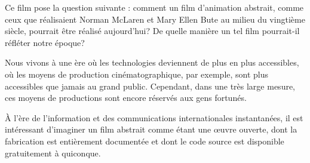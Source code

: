 


Ce film pose la question suivante : comment un film d'animation abstrait, comme ceux que réalisaient Norman McLaren et Mary Ellen Bute au milieu du vingtième siècle, pourrait être réalisé aujourd'hui? De quelle manière un tel film pourrait-il réfléter notre époque?

Nous vivons à une ère où les technologies deviennent de plus en plus accessibles, où les moyens de production cinématographique, par exemple, sont plus accessibles que jamais au grand public. Cependant, dans une très large mesure, ces moyens de productions sont encore réservés aux gens fortunés. 

À l'ère de l'information et des communications internationales instantanées, il est intéressant d'imaginer un film abstrait comme étant une \oe{}uvre ouverte, dont la fabrication est entièrement documentée et dont le code source est disponible gratuitement à quiconque.

\newpage

% 








